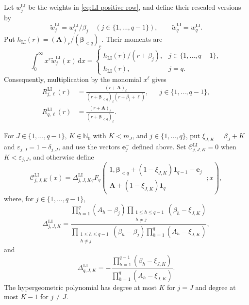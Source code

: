 \documentclass[10pt]{amsart}
\newcommand{\Nzero}{\mathbb N_0}
\newcommand{\dd}{\,\mathrm d}
\newcommand{\one}{\boldsymbol 1}
\newcommand{\A}{\boldsymbol A}
\newcommand{\bbeta}{\boldsymbol\beta}
\newcommand{\ee}{\boldsymbol e}
\newcommand{\pFq}[5]{{}_{#1}F_{#2}\!\left(\begin{matrix}#3\\#4\end{matrix};#5\right)}
\theoremstyle{plain}
\theoremstyle{definition}
\theoremstyle{remark}
\begin{document}
Let \(w_j^{\mathrm{LI}}\) be the weights in
\eqref{eq:LI-positive-row}, and define their rescaled versions by
\begin{equation}
 \widetilde w_j^{\mathrm{LI}}=w_j^{\mathrm{LI}}/\beta_j\quad
 (j\in\{1,\ldots,q-1\}),
 \qquad
 \widetilde w_q^{\mathrm{LI}}=w_q^{\mathrm{LI}}.
 \label{eq:LI-canonical-rows}
\end{equation}
Put \(h_{\mathrm{LI}}(r)=(\A)_r/(\bbeta_{<q})_r\). Their moments are
\[
 \int_0^\infty x^r\widetilde w_j^{\mathrm{LI}}(x)\dd x
 =\begin{cases}
 h_{\mathrm{LI}}(r)/(r+\beta_j),&j\in\{1,\ldots,q-1\},\\
 h_{\mathrm{LI}}(r),&j=q.
 \end{cases}
\]
Consequently, multiplication by the monomial \(x^\ell\) gives
\begin{align}
 R_{j,\ell}^{\mathrm{LI}}(r)
 &=\frac{(r+\A)_\ell}
 {(r+\bbeta_{<q})_\ell(r+\beta_j+\ell)},&&
 j\in\{1,\ldots,q-1\},
 \label{eq:LI-component-kernel-row}\\
 R_{q,\ell}^{\mathrm{LI}}(r)
 &=\frac{(r+\A)_\ell}{(r+\bbeta_{<q})_\ell}.
 \label{eq:LI-component-kernel-base}
\end{align}

For \(J\in\{1,\ldots,q-1\}\), \(K\in\Nzero\) with \(K<m_J\), and
\(j\in\{1,\ldots,q\}\), put
\(\xi_{J,K}=\beta_J+K\) and
\(\varepsilon_{j,J}=1-\delta_{j,J}\), and use the vectors \(\ee_j^-\)
defined above. Set
\(\mathcal C_{j,J,K}^{\mathrm{LI}}=0\) when
\(K<\varepsilon_{j,J}\), and otherwise define
\begin{equation}
 \mathcal C_{j,J,K}^{\mathrm{LI}}(x)
 =\Delta_{j,J,K}^{\mathrm{LI}}
 \pFq{q}{q}
 {1,\bbeta_{<q}+(1-\xi_{J,K})\one_{q-1}-\ee_j^-}
 {\A+(1-\xi_{J,K})\one_q}{x},
 \label{eq:LI-finite-pole-block}
\end{equation}
where, for \(j\in\{1,\ldots,q-1\}\),
\begin{equation}
 \Delta_{j,J,K}^{\mathrm{LI}}
 =\frac{\prod_{h=1}^{q}(A_h-\beta_j)
   \prod_{\substack{1\le h\le q-1\\h\ne j}}(\beta_h-\xi_{J,K})}
  {\prod_{\substack{1\le h\le q-1\\h\ne j}}(\beta_h-\beta_j)
   \prod_{h=1}^{q}(A_h-\xi_{J,K})},
 \label{eq:LI-finite-pole-prefactor-row}
\end{equation}
and
\begin{equation}
 \Delta_{q,J,K}^{\mathrm{LI}}
 =-\frac{\prod_{h=1}^{q-1}(\beta_h-\xi_{J,K})}
         {\prod_{h=1}^{q}(A_h-\xi_{J,K})}.
 \label{eq:LI-finite-pole-prefactor-base}
\end{equation}
The hypergeometric polynomial has degree at most \(K\) for \(j=J\) and
degree at most \(K-1\) for \(j\ne J\).
\end{document}
